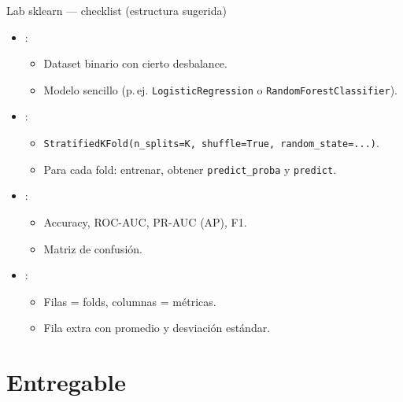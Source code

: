 \begin{frame}{Lab sklearn — checklist (estructura sugerida)}
\small
\begin{itemize}
  \item {}:
  \begin{itemize}
    \item Dataset binario con cierto desbalance.
    \item Modelo sencillo (p.\,ej. \texttt{LogisticRegression} o \texttt{RandomForestClassifier}).
  \end{itemize}
  \item {}:
  \begin{itemize}
    \item \texttt{StratifiedKFold(n\_splits=K, shuffle=True, random\_state=...)}.
    \item Para cada fold: entrenar, obtener \texttt{predict\_proba} y \texttt{predict}.
  \end{itemize}
  \item {}:
  \begin{itemize}
    \item Accuracy, ROC-AUC, PR-AUC (AP), F1.
    \item Matriz de confusión.
  \end{itemize}
  \item {}:
  \begin{itemize}
    \item Filas = folds, columnas = métricas.
    \item Fila extra con promedio y desviación estándar.
  \end{itemize}
\end{itemize}
\end{frame}

\section[Entregable]{Entregable\label{sec:entregable}}

